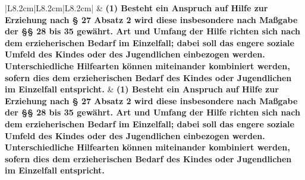 \documentclass[10pt,a4paper,landscape]{article}
\begin{document}
\begin{longtable}{|L{8.2cm}|L{8.2cm}|L{8.2cm}|}
\hhline{|---|}
 & \textbf{(1) Besteht ein Anspruch auf Hilfe zur  \newline Erziehung nach \S{} 27 Absatz 2 wird diese  \newline insbesondere nach Maßgabe der \S{}\S{} 28  \newline bis 35 gewährt. Art und Umfang der Hilfe  \newline richten sich nach dem erzieherischen  \newline Bedarf im Einzelfall; dabei soll das  \newline engere soziale Umfeld des Kindes oder  \newline des Jugendlichen einbezogen werden.  \newline Unterschiedliche Hilfearten können  \newline miteinander kombiniert werden, sofern  \newline dies dem erzieherischen Bedarf des  \newline Kindes oder Jugendlichen im Einzelfall  \newline entspricht. } & \textbf{(1) Besteht ein Anspruch auf Hilfe zur  \newline Erziehung nach \S{} 27 Absatz 2 wird diese  \newline insbesondere nach Maßgabe der \S{}\S{} 28  \newline bis 35 gewährt. Art und Umfang der Hilfe  \newline richten sich nach dem erzieherischen  \newline Bedarf im Einzelfall; dabei soll das  \newline engere soziale Umfeld des Kindes oder  \newline des Jugendlichen einbezogen werden.  \newline Unterschiedliche Hilfearten können  \newline miteinander kombiniert werden, sofern  \newline dies dem erzieherischen Bedarf des  \newline Kindes oder Jugendlichen im Einzelfall  \newline entspricht. } \\
\hhline{|---|}

\end{longtable}
\end{document}
